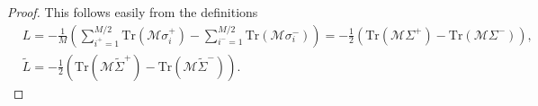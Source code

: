 \documentclass[10pt,a4paper]{amsart}
\begin{document}
\begin{proof}
   This follows easily from the definitions
\begin{align}
    &L=-\frac{1}{M}\left(\sum_{i^+=1}^{M/2}\text{Tr}(\mathcal{M}\sigma_i^+)-\sum_{i^-=1}^{M/2}\text{Tr}(\mathcal{M}\sigma_i^-)\right)=-\frac{1}{2}(\text{Tr}(\mathcal{M}\Sigma^+)-\text{Tr}(\mathcal{M}\Sigma^-)), \\
    & \tilde{L}=-\frac{1}{2}(\text{Tr}(\mathcal{M}\tilde{\Sigma}^+)-\text{Tr}(\mathcal{M}\tilde{\Sigma}^-)).
\end{align}
\end{proof}
\end{document}

